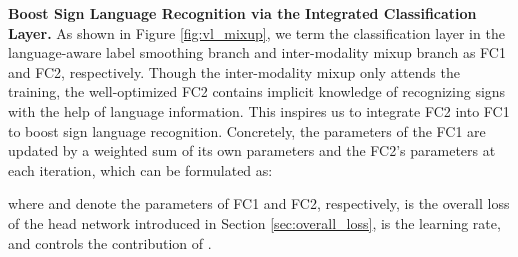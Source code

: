\documentclass[10pt,twocolumn,letterpaper]{article}
\begin{document}
\noindent\textbf{Boost Sign Language Recognition via the Integrated Classification Layer.} As shown in Figure \ref{fig:vl_mixup}, we term the classification layer in the language-aware label smoothing branch and inter-modality mixup branch as FC1 and FC2, respectively. Though the inter-modality mixup only attends the training, the well-optimized FC2 contains implicit knowledge of recognizing signs with the help of language information. This inspires us to integrate FC2 into FC1 to boost sign language recognition. Concretely, the parameters of the FC1 are updated by a weighted sum of its own parameters and the FC2's parameters at each iteration, which can be formulated as:

where  and  denote the parameters of FC1 and FC2, respectively,  is the overall loss of the head network introduced in Section \ref{sec:overall_loss},  is the learning rate, and  controls the contribution of .
\end{document}
